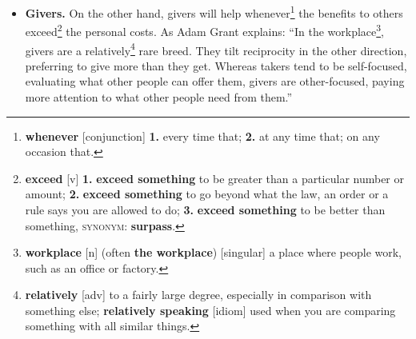 \documentclass[oneside]{book}
\numberwithin{equation}{section}
\begin{document}
\begin{itemize}
	\item \textbf{Givers.} On the other hand, givers will help whenever\footnote{\textbf{whenever} [conjunction] \textbf{1.} every time that; \textbf{2.} at any time that; on any occasion that.} the benefits to others exceed\footnote{\textbf{exceed} [v] \textbf{1.} \textbf{exceed something} to be greater than a particular number or amount; \textbf{2.} \textbf{exceed something} to go beyond what the law, an order or a rule says you are allowed to do; \textbf{3.} \textbf{exceed something} to be better than something, \textsc{synonym}: \textbf{surpass}.} the personal costs. As Adam Grant explains: ``In the workplace\footnote{\textbf{workplace} [n] (often \textbf{the workplace}) [singular] a place where people work, such as an office or factory.}, givers are a relatively\footnote{\textbf{relatively} [adv] to a fairly large degree, especially in comparison with something else; \textbf{relatively speaking} [idiom] used when you are comparing something with all similar things.} rare breed. They tilt reciprocity in the other direction, preferring to give more than they get. Whereas takers tend to be self-focused, evaluating what other people can offer them, givers are other-focused, paying more attention to what other people need from them.''

\end{itemize}
\end{document}
